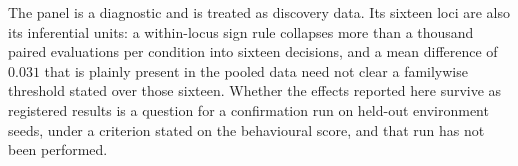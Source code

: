 The panel is a diagnostic and is treated as discovery data. Its sixteen loci are
also its inferential units: a within-locus sign rule collapses more than a thousand
paired evaluations per condition into sixteen decisions, and a mean difference of
$0.031$ that is plainly present in the pooled data need not clear a familywise
threshold stated over those sixteen. Whether the effects reported here survive as
registered results is a question for a confirmation run on held-out environment
seeds, under a criterion stated on the behavioural score, and that run has not been
performed.
